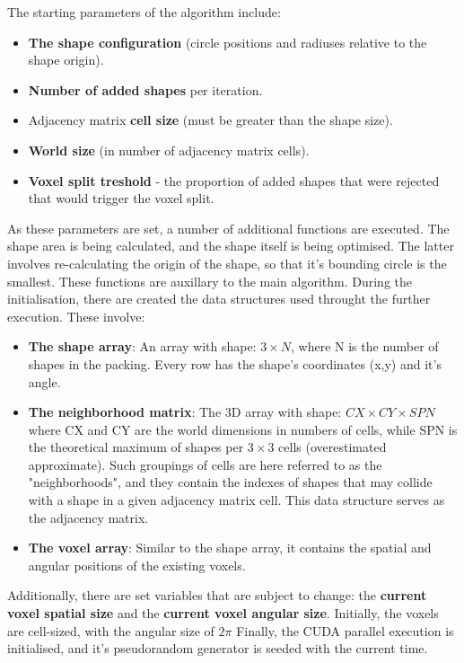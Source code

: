 \documentclass[12pt, oneside]{report}
\begin{document}
The starting parameters of the algorithm include:
\begin{itemize}
  \item \textbf{The shape configuration} (circle positions and radiuses relative to the shape origin).
  \item \textbf{Number of added shapes} per iteration.
  \item Adjacency matrix \textbf{cell size} (must be greater than the shape size).
  \item \textbf{World size} (in number of adjacency matrix cells).
	\item \textbf{Voxel split treshold} - the proportion of added shapes that were rejected that would trigger the voxel split.
\end{itemize}
As these parameters are set, a number of additional functions are executed. The shape area is being calculated, and the shape itself is being optimised. The latter involves re-calculating the origin of the shape, so that it's bounding circle is the smallest. These functions are auxillary to the main algorithm.
\newline
During the initialisation, there are created the data structures used throught the further execution. These involve:
\begin{itemize}
  \item \textbf{The shape array}: An array with shape: $3 \times N$, where N is the number of shapes in the packing. Every row has the shape's coordinates (x,y) and it's angle.
  \item \textbf{The neighborhood matrix}: The 3D array with shape: $CX \times CY \times SPN$ where CX and CY are the world dimensions in numbers of cells, while SPN is the theoretical maximum of shapes per $3 \times 3$ cells (overestimated approximate). Such groupings of cells are here referred to as the "neighborhoods", and they contain the indexes of shapes that may collide with a shape in a given adjacency matrix cell. This data structure serves as the adjacency matrix.
  \item \textbf{The voxel array}: Similar to the shape array, it contains the spatial and angular positions of the existing voxels.
\end{itemize}
Additionally, there are set variables that are subject to change: the \textbf{current voxel spatial size} and the \textbf{current voxel angular size}. Initially, the voxels are cell-sized, with the angular size of $2 \pi$
Finally, the CUDA parallel execution is initialised, and it's pseudorandom generator is seeded with the current time.
\end{document}
